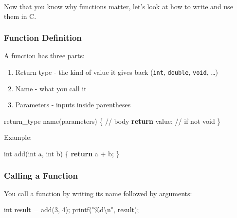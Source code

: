 \documentclass[
  letterpaper,
  DIV=11,
  numbers=noendperiod]{scrreprt}
\newenvironment{Shaded}{\begin{snugshade}}{\end{snugshade}}
\newcommand{\CommentTok}[1]{\textcolor[rgb]{0.37,0.37,0.37}{#1}}
\newcommand{\ControlFlowTok}[1]{\textcolor[rgb]{0.00,0.23,0.31}{\textbf{#1}}}
\newcommand{\DataTypeTok}[1]{\textcolor[rgb]{0.68,0.00,0.00}{#1}}
\newcommand{\DecValTok}[1]{\textcolor[rgb]{0.68,0.00,0.00}{#1}}
\newcommand{\NormalTok}[1]{\textcolor[rgb]{0.00,0.23,0.31}{#1}}
\newcommand{\OperatorTok}[1]{\textcolor[rgb]{0.37,0.37,0.37}{#1}}
\newcommand{\SpecialCharTok}[1]{\textcolor[rgb]{0.37,0.37,0.37}{#1}}
\newcommand{\StringTok}[1]{\textcolor[rgb]{0.13,0.47,0.30}{#1}}
\providecommand{\tightlist}{%
  \setlength{\itemsep}{0pt}\setlength{\parskip}{0pt}}
\begin{document}
Now that you know why functions matter, let's look at how to write and
use them in C.

\subsubsection{Function Definition}\label{function-definition}

A function has three parts:

\begin{enumerate}
\def\labelenumi{\arabic{enumi}.}
\tightlist
\item
  Return type - the kind of value it gives back (\texttt{int},
  \texttt{double}, \texttt{void}, \ldots)
\item
  Name - what you call it
\item
  Parameters - inputs inside parentheses
\end{enumerate}

\begin{Shaded}
\begin{Highlighting}[]
\NormalTok{return\_type name}\OperatorTok{(}\NormalTok{parameters}\OperatorTok{)} \OperatorTok{\{}
    \CommentTok{// body}
    \ControlFlowTok{return}\NormalTok{ value}\OperatorTok{;}   \CommentTok{// if not void}
\OperatorTok{\}}
\end{Highlighting}
\end{Shaded}

Example:

\begin{Shaded}
\begin{Highlighting}[]
\DataTypeTok{int}\NormalTok{ add}\OperatorTok{(}\DataTypeTok{int}\NormalTok{ a}\OperatorTok{,} \DataTypeTok{int}\NormalTok{ b}\OperatorTok{)} \OperatorTok{\{}
    \ControlFlowTok{return}\NormalTok{ a }\OperatorTok{+}\NormalTok{ b}\OperatorTok{;}
\OperatorTok{\}}
\end{Highlighting}
\end{Shaded}

\subsubsection{Calling a Function}\label{calling-a-function}

You call a function by writing its name followed by arguments:

\begin{Shaded}
\begin{Highlighting}[]
\DataTypeTok{int}\NormalTok{ result }\OperatorTok{=}\NormalTok{ add}\OperatorTok{(}\DecValTok{3}\OperatorTok{,} \DecValTok{4}\OperatorTok{);}
\NormalTok{printf}\OperatorTok{(}\StringTok{"}\SpecialCharTok{\%d\textbackslash{}n}\StringTok{"}\OperatorTok{,}\NormalTok{ result}\OperatorTok{);}
\end{Highlighting}
\end{Shaded}
\end{document}
